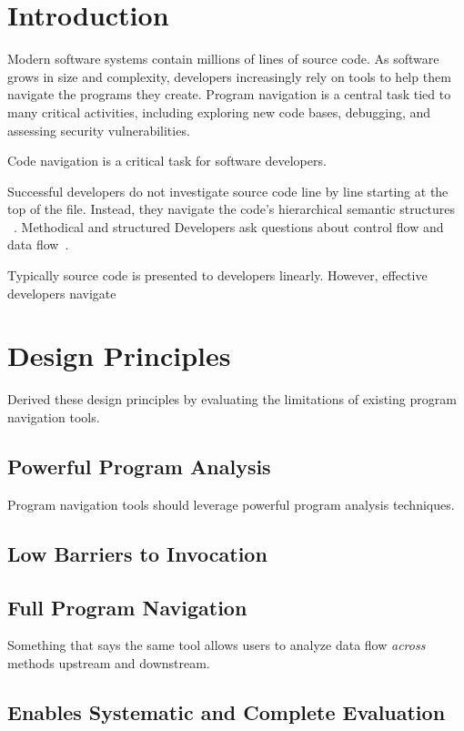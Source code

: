 \documentclass[conference]{IEEEtran}
\begin{document}
\section{Introduction}
Modern software systems contain millions of lines of source code. 
As software grows in size and complexity, developers increasingly rely on tools to help them navigate the programs they create. 
Program navigation is a central task tied to many critical activities, including exploring new code bases, debugging, and assessing security vulnerabilities.


Code navigation is a critical task for software developers. 

Successful developers do not investigate source code line by line starting at the top of the file. Instead, they navigate the code's hierarchical semantic structures ~\cite{robillard2004investigate}. Methodical and structured
Developers ask questions about control flow and data flow~\cite{latoza2010hard, Smith2015}. 

Typically source code is presented to developers linearly. However, effective developers navigate   

\section{Design Principles}
Derived these design principles by evaluating the limitations of existing program navigation tools. 
\subsection{Powerful Program Analysis}
Program navigation tools should leverage powerful program analysis techniques. 

\subsection{Low Barriers to Invocation}

\subsection{Full Program Navigation}
Something that says the same tool allows users to analyze data flow \textit{across} methods upstream and downstream.

\subsection{Enables Systematic and Complete Evaluation}
\end{document}
